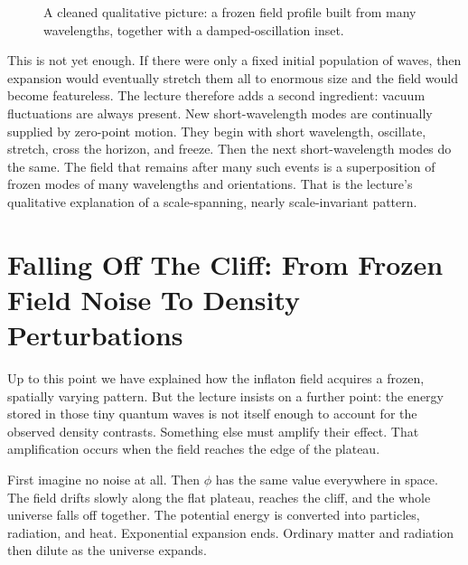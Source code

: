 \begin{figure}[htbp]
\centering
{}
\caption{A cleaned qualitative picture: a frozen field profile built from many wavelengths, together with a damped-oscillation inset.}
\end{figure}

This is not yet enough. If there were only a fixed initial population of waves, then expansion would eventually stretch them all to enormous size and the field would become featureless. The lecture therefore adds a second ingredient: vacuum fluctuations are always present. New short-wavelength modes are continually supplied by zero-point motion. They begin with short wavelength, oscillate, stretch, cross the horizon, and freeze. Then the next short-wavelength modes do the same. The field that remains after many such events is a superposition of frozen modes of many wavelengths and orientations. That is the lecture's qualitative explanation of a scale-spanning, nearly scale-invariant pattern.

\section{Falling Off The Cliff: From Frozen Field Noise To Density Perturbations}

Up to this point we have explained how the inflaton field acquires a frozen, spatially varying pattern. But the lecture insists on a further point: the energy stored in those tiny quantum waves is not itself enough to account for the observed density contrasts. Something else must amplify their effect. That amplification occurs when the field reaches the edge of the plateau.

First imagine no noise at all. Then \(\phi\) has the same value everywhere in space. The field drifts slowly along the flat plateau, reaches the cliff, and the whole universe falls off together. The potential energy is converted into particles, radiation, and heat. Exponential expansion ends. Ordinary matter and radiation then dilute as the universe expands.

